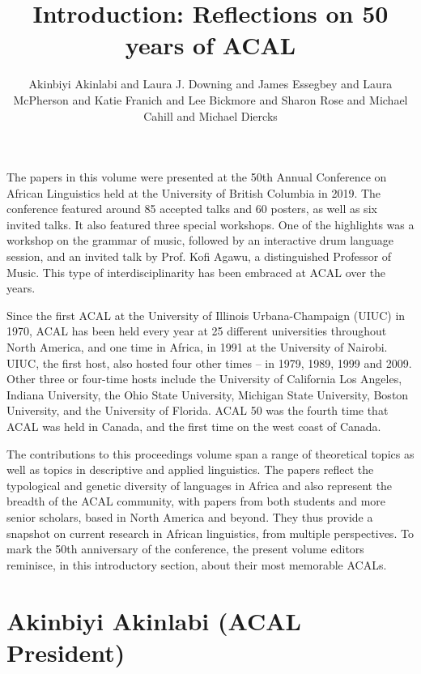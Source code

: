 \documentclass[output=paper]{langscibook}
\author[Akinbiyi Akinlabi and others]{Akinbiyi Akinlabi\affiliation{Rutgers University} and Laura J. Downing\affiliation{University of Gothenburg} and James Essegbey\affiliation{University of Florida} and Laura McPherson\affiliation{Dartmouth College} and Katie Franich\affiliation{University of Delaware} and Lee Bickmore\affiliation{University at Albany, State University of New York} and Sharon Rose\affiliation{University of California, San Diego} and Michael Cahill\affiliation{SIL} and Michael Diercks\affiliation{Pomona College}}
\title{Introduction: Reflections on 50 years of ACAL}
\begin{document}
\maketitle

\noindent The papers in this volume were presented at the 50th Annual Conference on African Linguistics held at the University of British Columbia in 2019. The conference featured around 85 accepted talks and 60 posters, as well as six invited talks. It also featured three special workshops. One of the highlights was a workshop on the grammar of music, followed by an interactive drum language session, and an invited talk by Prof. Kofi Agawu, a distinguished Professor of Music. This type of interdisciplinarity has been embraced at ACAL over the years. 

Since the first ACAL at the University of Illinois Urbana-Champaign (UIUC) in 1970, ACAL has been held every year at 25 different universities throughout North America, and one time in Africa, in 1991 at the University of Nairobi. UIUC, the first host, also hosted four other times -- in 1979, 1989, 1999 and 2009. Other three or four-time hosts include the University of California Los Angeles, Indiana University, the Ohio State University, Michigan State University, Boston University, and the University of Florida. ACAL 50 was the fourth time that ACAL was held in Canada, and the first time on the west coast of Canada. 

The contributions to this proceedings volume span a range of theoretical topics as well as topics in descriptive and applied linguistics. The papers reflect the typological and genetic diversity of languages in Africa and also represent the breadth of the ACAL community, with papers from both students and more senior scholars, based in North America and beyond. They thus provide a snapshot on current research in African linguistics, from multiple perspectives. To mark the 50th anniversary of the conference, the present volume editors reminisce, in this introductory section, about their most memorable ACALs.

\section*{Akinbiyi Akinlabi (ACAL President)}
\end{document}
